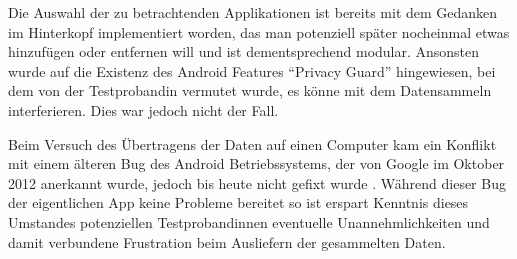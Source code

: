 Die Auswahl der zu betrachtenden Applikationen ist bereits mit dem Gedanken im Hinterkopf implementiert worden, das man potenziell später nocheinmal etwas hinzufügen oder entfernen will und ist dementsprechend modular.
Ansonsten wurde auf die Existenz des Android Features "`Privacy Guard"' hingewiesen, bei dem von der Testprobandin vermutet wurde, es könne mit dem Datensammeln interferieren.
Dies war jedoch nicht der Fall.
\par
Beim Versuch des Übertragens der Daten auf einen Computer kam ein Konflikt mit einem älteren Bug des Android Betriebssystems, der von Google im Oktober 2012 anerkannt wurde, jedoch bis heute nicht gefixt wurde
\cite{androidbug}.
Während dieser Bug der eigentlichen App keine Probleme bereitet so ist erspart Kenntnis dieses Umstandes potenziellen Testprobandinnen eventuelle Unannehmlichkeiten und damit verbundene Frustration beim Ausliefern der gesammelten Daten.


